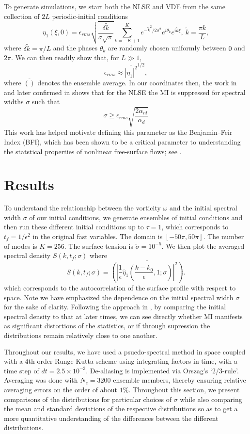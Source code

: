 \documentclass[a4paper,11pt]{article}
\begin{document}
To generate simulations, we start both the NLSE and VDE from the same collection of $2L$ periodic-initial conditions
\[
\eta_{1}(\xi,0) = \epsilon_{rms}\sqrt{\frac{\delta \tilde{k}}{\sigma\sqrt{\pi}}} \sum_{k=-K+1}^{K}e^{-\tilde{k}^{2}/2\sigma^{2}}e^{i\theta_{k}}e^{i\tilde{k}\xi}, ~ \tilde{k} = \frac{\pi k}{L},
\]
where $\delta \tilde{k}=\pi/L$ and the phases $\theta_{k}$ are randomly chosen uniformly between $0$ and $2\pi$.  We can then readily show that, for $L\gg 1$, 
\[
\epsilon_{rms} \approx \overline{\left|\eta_{1}\right|^{2}}^{1/2},
\]
where $\overline{()}$ denotes the ensemble average.  In our coordinates then, the work in \cite{alber} and later confirmed in \cite{dysthe2} shows that for the NLSE the MI is suppressed for spectral widths $\sigma$ such that 
\[
\sigma \geq \epsilon_{rms}\sqrt{\frac{2\alpha_{nl}}{\alpha_{d}}}
\]
This work has helped motivate defining this parameter as the Benjamin--Feir Index (BFI), which has been shown to be a critical parameter to understanding the statstical properties of nonlinear free-surface flows; see \cite{onorato, thomas2012nonlinear}.
\section*{Results}
To understand the relationship between the vorticity $\omega$ and the initial spectral width $\sigma$ of our initial conditions, we generate ensembles of initial conditions and then run these different initial conditions up to $\tau=1$, which corresponds to $t_{f} = 1/\epsilon^{2}$ in the original fast variables.  The domain is $[-50\pi,50\pi]$.  The number of modes is $K = 256$.  The surface tension is $\tilde{\sigma} = 10^{-5}$. We then plot the averaged spectral density $S(k,t_{f};\sigma)$ where 
\[
S\left(k,t_{f};\sigma\right) = \overline{\left( \left|\frac{1}{\epsilon}\hat{\eta}_{1}\left(\frac{k-k_{0}}{\epsilon},1;\sigma \right)\right|^{2}\right)}.
\]
which corresponds to the autocorrelation of the surface profile with respect to space.  Note we have emphasized the dependence on the initial spectral width $\sigma$ for the sake of clarity.  Following the approach in \cite{dysthe2,dysthe3}, by comparing the initial spectral density to that at later times, we can see directly whether MI manifests as significant distortions of the statistics, or if through supression the distributions remain relatively close to one another.  

Throughout our results, we have used a psuedo-spectral method in space coupled with a 4th-order Runge-Kutta scheme using integrating factors in time, with a time step of $dt = 2.5 \times 10^{-3}$.  De-aliasing is implemented via Orszag's `2/3-rule'.  Averaging was done with $N_{e}=3200$ ensemble members, thereby ensuring relative averaging errors on the order of about $1\%$.  Throughout this section, we present comparisons of the distributions for particular choices of $\sigma$ while also comparing the mean and standard deviations of the respective distributions so as to get a more quantitative understanding of the differences between the different distributions.  
\end{document}
